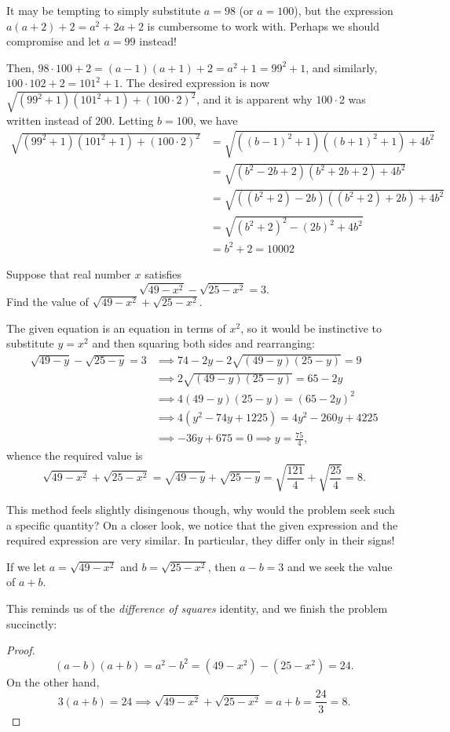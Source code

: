 \documentclass[../jarvis.tex]{subfiles}
\begin{document}
It may be tempting to simply substitute $a=98$ (or $a=100$), but the expression $a(a+2)+2=a^2+2a+2$ is cumbersome to work with. Perhaps we should compromise and let $a=99$ instead!

Then, $98\cdot 100+2= (a-1)(a+1)+2=a^2+1=99^2+1$, and similarly, $100\cdot 102+2 = 101^2+1$. The desired expression is now
$\sqrt{(99^2+1)(101^2+1)+(100\cdot 2)^2}$, and it is apparent why $100\cdot 2$ was written instead of $200$. Letting $b=100$, we have
\begin{align*}
    \sqrt{(99^2+1)(101^2+1)+(100\cdot 2)^2}&=\sqrt{((b-1)^2+1)((b+1)^2+1)+4b^2}\\
    &=\sqrt{(b^2-2b+2)(b^2+2b+2)+4b^2} \\
    &=\sqrt{((b^2+2)-2b)((b^2+2)+2b)+4b^2} \\
    &=\sqrt{(b^2+2)^2-(2b)^2+4b^2} \\
    &= b^2+2=\boxed{10002}
\end{align*}

\begin{example}[2018 AMC10 A/10]
    Suppose that real number $x$ satisfies $$\sqrt{49-x^2}-\sqrt{25-x^2}=3.$$
    Find the value of $\sqrt{49-x^2}+\sqrt{25-x^2}$.
\end{example}
The given equation is an equation in terms of $x^2$, so it would be instinctive to substitute $y=x^2$ and then squaring both sides and rearranging:
\begin{align*}
    \sqrt{49-y}-\sqrt{25-y}=3 &\implies 74-2y-2\sqrt{(49-y)(25-y)}=9 \\
    &\implies 2\sqrt{(49-y)(25-y)}=65-2y\\
    &\implies 4(49-y)(25-y)=(65-2y)^2 \\
    &\implies 4(y^2-74y+1225)=4y^2-260y+4225 \\
    &\implies -36y+675=0 \implies y=\frac{75}{4},
\end{align*}
whence the required value is 
$$\sqrt{49-x^2}+\sqrt{25-x^2}=\sqrt{49-y}+\sqrt{25-y}=\sqrt{\frac{121}{4}}+\sqrt{\frac{25}{4}}=\boxed{8}.$$

This method feels slightly disingenous though, why would the problem seek such a specific quantity? On a closer look, we notice that the given expression and the required expression are very similar. In particular, they differ only in their signs!

If we let $a=\sqrt{49-x^2}$ and $b=\sqrt{25-x^2}$, then $a-b=3$ and we seek the value of $a+b$.

This reminds us of the \textit{difference of squares} identity, and we finish the problem succinctly:
\begin{proof}
    $$(a-b)(a+b)=a^2-b^2=(49-x^2)-(25-x^2)=24.$$
On the other hand, 
$$3(a+b)=24 \implies \sqrt{49-x^2}+\sqrt{25-x^2}=a+b=\frac{24}{3}=\boxed{8}.$$
\end{proof} 
\end{document}
